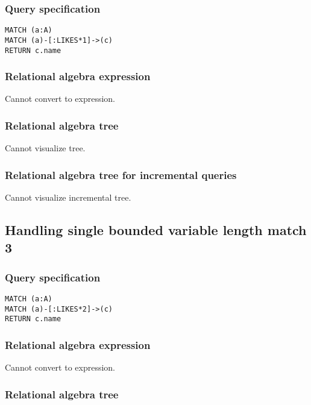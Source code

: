\subsubsection*{Query specification}

\begin{lstlisting}
MATCH (a:A)
MATCH (a)-[:LIKES*1]->(c)
RETURN c.name
\end{lstlisting}

\subsubsection*{Relational algebra expression}

Cannot convert to expression.

\subsubsection*{Relational algebra tree}

Cannot visualize tree.

\subsubsection*{Relational algebra tree for incremental queries}

Cannot visualize incremental tree.

\subsection{Handling single bounded variable length match 3}

\subsubsection*{Query specification}

\begin{lstlisting}
MATCH (a:A)
MATCH (a)-[:LIKES*2]->(c)
RETURN c.name
\end{lstlisting}

\subsubsection*{Relational algebra expression}

Cannot convert to expression.

\subsubsection*{Relational algebra tree}

